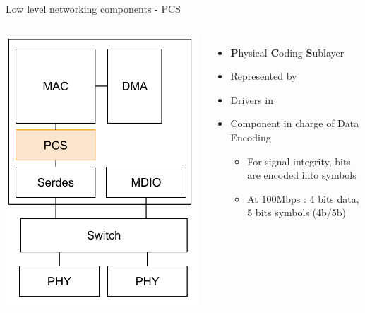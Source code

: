 \begin{frame}{Low level networking components - PCS}
	\begin{columns}
			\includegraphics[width=\textwidth]{slides/networking-driver-overview/net_components_pcs.pdf}
		\begin{itemize}
			\item \textbf{P}hysical \textbf{C}oding \textbf{S}ublayer
			\item Represented by 
			\item Drivers in 
			\item Component in charge of Data Encoding
				\begin{itemize}
					\item For signal integrity, bits are encoded into symbols
					\item At 100Mbps : 4 bits data, 5 bits symbols (4b/5b)

\end{itemize}
\end{itemize}
\end{columns}
\end{frame}
